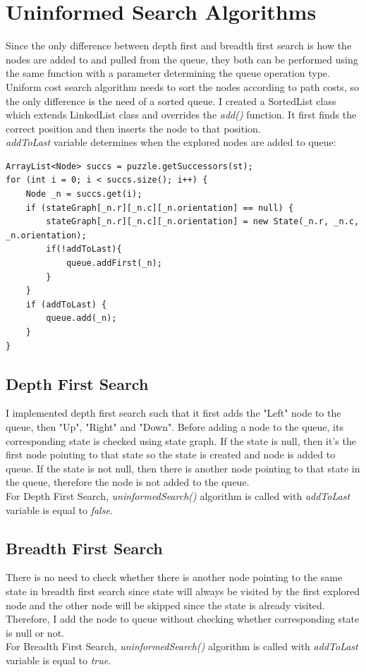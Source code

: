\documentclass[12pt]{article}
\begin{document}
\section{Uninformed Search Algorithms}

Since the only difference between depth first and breadth first search is how the nodes are added to and pulled from the queue, they both can be performed using the same function with a parameter determining the queue operation type. Uniform cost search algorithm needs to sort the nodes according to path costs, so the only difference is the need of a sorted queue. I created a SortedList class which extends LinkedList class and overrides the \textit{add()} function. It first finds the correct position and then inserts the node to that position.\\
\textit{addToLast} variable determines when the explored nodes are added to queue:
\begin{lstlisting}[style=javastyle]
ArrayList<Node> succs = puzzle.getSuccessors(st);
for (int i = 0; i < succs.size(); i++) {
	Node _n = succs.get(i);
	if (stateGraph[_n.r][_n.c][_n.orientation] == null) {
		stateGraph[_n.r][_n.c][_n.orientation] = new State(_n.r, _n.c, _n.orientation);
		if(!addToLast){
			queue.addFirst(_n);
		}
	}
	if (addToLast) {
		queue.add(_n);
	}
}
\end{lstlisting}

\subsection{Depth First Search}
I implemented depth first search such that it first adds the "Left" node to the queue, then "Up", "Right" and "Down". Before adding a node to the queue, its corresponding state is checked using state graph. If the state is null, then it's the first node pointing to that state so the state is created and node is added to queue. If the state is not null, then there is another node pointing to that state in the queue, therefore the node is not added to the queue.\\
For Depth First Search, \textit{uninformedSearch()} algorithm is called with \textit{addToLast} variable is equal to \textit{false}.

\subsection{Breadth First Search}
There is no need to check whether there is another node pointing to the same state in breadth first search since state will always be visited by the first explored node and the other node will be skipped since the state is already visited. Therefore, I add the node to queue without checking whether corresponding state is null or not.\\
For Breadth First Search, \textit{uninformedSearch()} algorithm is called with \textit{addToLast} variable is equal to \textit{true}.
\end{document}
